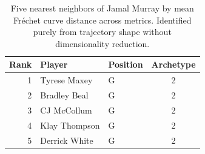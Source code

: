 \begin{table}[htbp]
  \centering\small
  \begin{tabular}{rllc}
    \toprule
    Rank & Player & Position & Archetype \\
    \midrule
    1 & Tyrese Maxey & G & 2 \\
    2 & Bradley Beal & G & 2 \\
    3 & CJ McCollum & G & 2 \\
    4 & Klay Thompson & G & 2 \\
    5 & Derrick White & G & 2 \\
    \bottomrule
  \end{tabular}
  \caption{Five nearest neighbors of Jamal Murray by mean Fr\'{e}chet curve distance across metrics. Identified purely from trajectory shape without dimensionality reduction.}
  \label{tab:Jamal_Murray_frechet_curve_neighbors}
\end{table}

